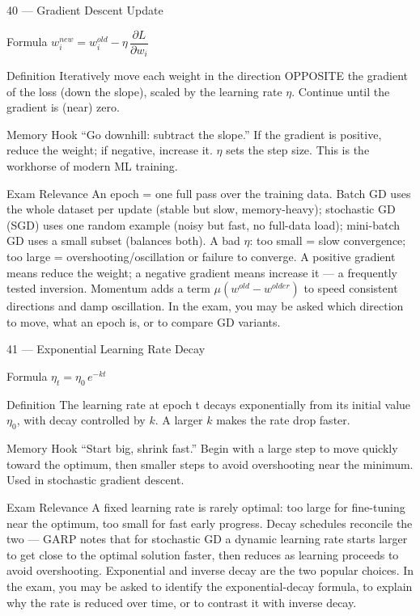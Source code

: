 \documentclass[aspectratio=169,8pt]{beamer}
\begin{document}
	\begin{frame}{40 --- Gradient Descent Update}
		\begin{block}{Formula}
			$w_i^{new} = w_i^{old} - \eta\,\dfrac{\partial L}{\partial w_i}$
		\end{block}
		\begin{block}{Definition}
			Iteratively move each weight in the direction OPPOSITE the gradient of the loss (down the slope), scaled by the learning rate $\eta$. Continue until the gradient is (near) zero.
		\end{block}
		\begin{block}{Memory Hook}
			``Go downhill: subtract the slope.'' If the gradient is positive, reduce the weight; if negative, increase it. $\eta$ sets the step size. This is the workhorse of modern ML training.
		\end{block}
		\begin{block}{Exam Relevance}
			An epoch = one full pass over the training data. Batch GD uses the whole dataset per update (stable but slow, memory-heavy); stochastic GD (SGD) uses one random example (noisy but fast, no full-data load); mini-batch GD uses a small subset (balances both). A bad $\eta$: too small = slow convergence; too large = overshooting/oscillation or failure to converge. A positive gradient means reduce the weight; a negative gradient means increase it --- a frequently tested inversion. Momentum adds a term $\mu(w^{old} - w^{older})$ to speed consistent directions and damp oscillation. In the exam, you may be asked which direction to move, what an epoch is, or to compare GD variants.
		\end{block}
	\end{frame}
	
	\begin{frame}{41 --- Exponential Learning Rate Decay}
		\begin{block}{Formula}
			$\eta_t = \eta_0\,e^{-kt}$
		\end{block}
		\begin{block}{Definition}
			The learning rate at epoch t decays exponentially from its initial value $\eta_0$, with decay controlled by $k$. A larger $k$ makes the rate drop faster.
		\end{block}
		\begin{block}{Memory Hook}
			``Start big, shrink fast.'' Begin with a large step to move quickly toward the optimum, then smaller steps to avoid overshooting near the minimum. Used in stochastic gradient descent.
		\end{block}
		\begin{block}{Exam Relevance}
			A fixed learning rate is rarely optimal: too large for fine-tuning near the optimum, too small for fast early progress. Decay schedules reconcile the two --- GARP notes that for stochastic GD a dynamic learning rate starts larger to get close to the optimal solution faster, then reduces as learning proceeds to avoid overshooting. Exponential and inverse decay are the two popular choices. In the exam, you may be asked to identify the exponential-decay formula, to explain why the rate is reduced over time, or to contrast it with inverse decay.
		\end{block}
	\end{frame}
	
\end{document}
